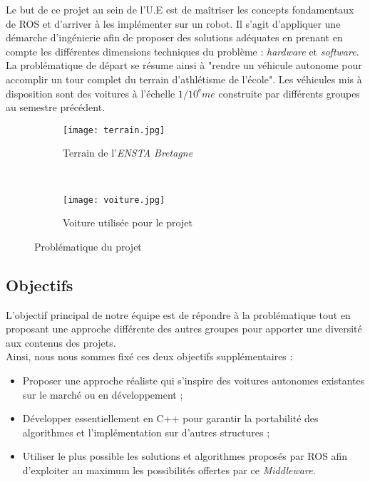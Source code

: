 \documentclass[12pt, openany]{report}
\begin{document}
Le but de ce projet au sein de l'U.E est de maîtriser les concepts fondamentaux de \textsc{ROS} et d'arriver à les implémenter sur un robot. Il s'agit d'appliquer une démarche d'ingénierie afin de proposer des solutions adéquates en prenant en compte les différentes dimensions techniques du problème : \textit{hardware} et \textit{software}.\\

La problématique de départ se résume ainsi à "rendre un véhicule autonome pour accomplir un tour complet du terrain d'athlétisme de l'école". Les véhicules mis à disposition sont des voitures à l'échelle $1/10^ème$ construite par différents groupes au semestre précédent.

\begin{figure}[!h]
     \centering
     \begin{subfigure}[b]{0.45\textwidth}
         \centering
         \texttt{[image: terrain.jpg]}
         \caption{Terrain de l'\textit{ENSTA Bretagne}}
     \end{subfigure}
     ~
     \begin{subfigure}[b]{0.45\textwidth}
         \centering
         \texttt{[image: voiture.jpg]}
         \caption{Voiture utilisée pour le projet}
     \end{subfigure}
     \caption{Problématique du projet}
     \label{fig:prob}
\end{figure}

\subsection{Objectifs}
L'objectif principal de notre équipe est de répondre à la problématique tout en proposant une approche différente des autres groupes pour apporter une diversité aux contenus des projets.\\

Ainsi, nous nous sommes fixé ces deux objectifs supplémentaires : 
\begin{itemize}[label=\textbullet, font=\small]
    \item Proposer une approche réaliste qui s'inspire des voitures autonomes existantes sur le marché ou en développement ;
    \item Développer essentiellement en \textsc{C++} pour garantir la portabilité des algorithmes et l'implémentation sur d'autres structures ;\\
    \item Utiliser le plus possible les solutions et algorithmes proposés par \textsc{ROS} afin d'exploiter au maximum les possibilités offertes par ce \textit{Middleware}.\\
\end{itemize}
\end{document}
